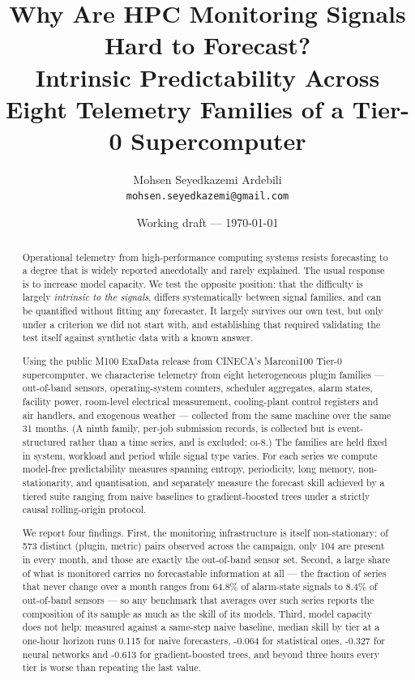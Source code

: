 \documentclass[11pt,a4paper]{article}
\title{Why Are HPC Monitoring Signals Hard to Forecast?\\
       \large Intrinsic Predictability Across Eight Telemetry Families
       of a Tier-0 Supercomputer}
\author{Mohsen Seyedkazemi Ardebili\\
        \small \texttt{mohsen.seyedkazemi@gmail.com}}
\date{Working draft --- \today}
\newcommand{\num}[1]{#1}
\newcommand{\oi}[1]{\textsc{oi-#1}}
\begin{document}
\maketitle

\begin{abstract}
Operational telemetry from high-performance computing systems resists
forecasting to a degree that is widely reported anecdotally and rarely
explained. The usual response is to increase model capacity. We test the
opposite position: that the difficulty is largely \emph{intrinsic to the
signals}, differs systematically between signal families, and can be quantified
without fitting any forecaster. It largely survives our own test, but only under
a criterion we did not start with, and establishing that required validating the
test itself against synthetic data with a known answer.

Using the public M100 ExaData release from CINECA's Marconi100 Tier-0
supercomputer, we characterise telemetry from eight heterogeneous plugin
families --- out-of-band sensors, operating-system counters, scheduler
aggregates, alarm states, facility power, room-level electrical measurement,
cooling-plant control registers and air handlers, and exogenous weather ---
collected from the same machine over the same 31 months. (A ninth family,
per-job submission records, is collected but is event-structured rather than a
time series, and is excluded; \oi{8}.) The families are held
fixed in system, workload and period while signal type varies.
For each series we compute model-free predictability measures spanning entropy,
periodicity, long memory, non-stationarity, and quantisation, and separately
measure the forecast skill achieved by a tiered suite ranging from naive
baselines to gradient-boosted trees under a strictly causal rolling-origin
protocol.

We report four findings. First, the monitoring infrastructure is itself
non-stationary: of \num{573} distinct (plugin, metric) pairs observed across the
campaign, only \num{104} are present in every month, and those are exactly the
out-of-band sensor set. Second, a large share of what is monitored carries no
forecastable information at all --- the fraction of series that never change
over a month ranges from \num{64.8}\% of alarm-state signals to \num{8.4}\% of
out-of-band sensors --- so any benchmark that averages over such series reports
the composition of its sample as much as the skill of its models. Third, model
capacity does not help: measured against a same-step naive baseline, median
skill by tier at a one-hour horizon runs \num{0.115} for naive forecasters,
\num{-0.064} for statistical ones, \num{-0.327} for neural networks and
\num{-0.613} for gradient-boosted trees, and beyond three hours every tier is
worse than repeating the last value.


\end{abstract}
\end{document}
